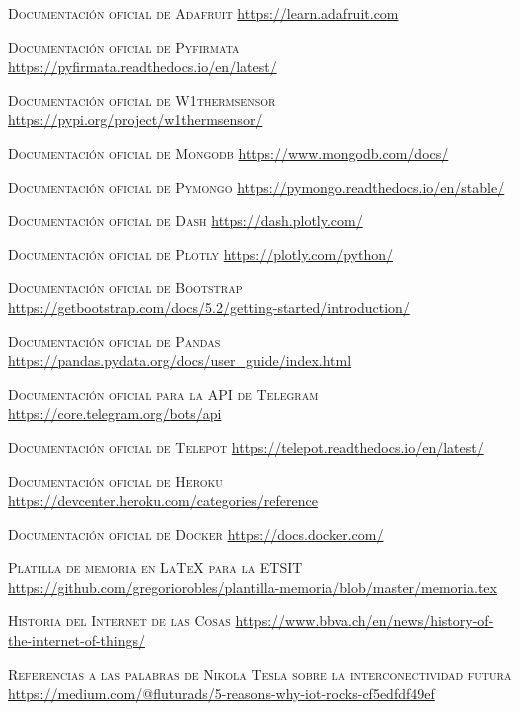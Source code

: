 \documentclass[a4paper, 12pt, oneside]{book}
\begin{document}
\begin{thebibliography}{X}

 \textsc{Documentación oficial de Adafruit}
\url{https://learn.adafruit.com}

 \textsc{Documentación oficial de Pyfirmata}
\url{https://pyfirmata.readthedocs.io/en/latest/}

 \textsc{Documentación oficial de W1thermsensor}
\url{https://pypi.org/project/w1thermsensor/}

 \textsc{Documentación oficial de Mongodb}
\url{https://www.mongodb.com/docs/}

 \textsc{Documentación oficial de Pymongo}
\url{https://pymongo.readthedocs.io/en/stable/}

 \textsc{Documentación oficial de Dash}
\url{https://dash.plotly.com/}

 \textsc{Documentación oficial de Plotly}
\url{https://plotly.com/python/}

 \textsc{Documentación oficial de Bootstrap}
\url{https://getbootstrap.com/docs/5.2/getting-started/introduction/}

 \textsc{Documentación oficial de Pandas}
\url{https://pandas.pydata.org/docs/user_guide/index.html}

 \textsc{Documentación oficial para la API de Telegram}
\url{https://core.telegram.org/bots/api}

 \textsc{Documentación oficial de Telepot}
\url{https://telepot.readthedocs.io/en/latest/}
	
 \textsc{Documentación oficial de Heroku}
\url{https://devcenter.heroku.com/categories/reference}
	
 \textsc{Documentación oficial de Docker}
\url{https://docs.docker.com/}

 \textsc{Platilla de memoria en LaTeX para la ETSIT}
\url{https://github.com/gregoriorobles/plantilla-memoria/blob/master/memoria.tex}

 \textsc{Historia del Internet de las Cosas}
\url{https://www.bbva.ch/en/news/history-of-the-internet-of-things/}

 \textsc{Referencias a las palabras de Nikola Tesla sobre la interconectividad futura}
\url{https://medium.com/@fluturads/5-reasons-why-iot-rocks-cf5edfdf49ef}


\end{thebibliography}
\end{document}
